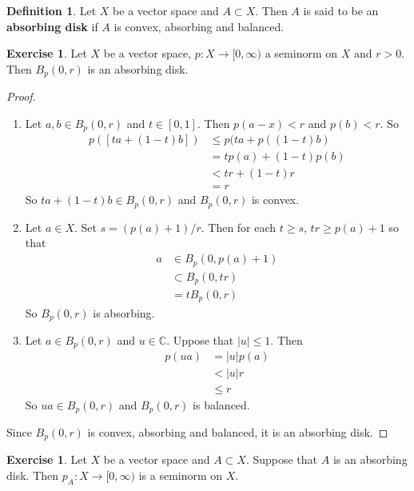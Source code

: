 \documentclass[12pt]{amsart}
\theoremstyle{definition}
\newtheorem{defn}[definition]{Definition}
\newtheorem{ex}[definition]{Exercise}
\newcommand{\C}{\mathbb{C}}
\newcommand{\tbf}[1]{\textbf{#1}}
\newcommand{\Rg}{[0,\infty)}
\DeclareMathOperator*{\0}{\mbf{0}}
\DeclareMathOperator*{\1}{\mbf{1}}
\begin{document}
		\begin{defn}
		Let $X$ be a vector space and $A \subset X$. Then $A$ is said to be an \tbf{absorbing disk} if $A$ is convex, absorbing and balanced.
	\end{defn}
	
	\begin{ex}
		Let $X$ be a vector space, $p :X \rightarrow \Rg$ a seminorm on $X$ and $r >0$. Then $B_p(0, r)$ is an absorbing disk.
	\end{ex}
	
	\begin{proof}\
		\begin{enumerate}
			\item Let $a, b \in B_p(0, r)$ and $t \in [0,1]$. Then $p(a - x) < r$ and $p(b) < r$. So 
			\begin{align*}
				p([ta + (1 - t)b]) 
				&\leq p(ta + p((1-t)b) \\
				&= tp(a) + (1-t)p(b) \\
				&< tr + (1-t)r \\
				&= r
			\end{align*}
			So $ta + (1 - t)b \in B_p(0, r)$ and $B_p(0, r)$ is convex.
			\item Let $a \in X$. Set $s = (p(a) + 1)/ r$. Then for each $t \geq s$, $tr \geq p(a)+1$ so that 
			\begin{align*}
				a 
				& \in B_p(0, p(a)+ 1) \\
				& \subset B_p(0, tr) \\
				& = tB_p(0, r) 
			\end{align*} 
			So $B_p(0,r)$ is absorbing.
			\item Let $a \in B_p(0, r)$ and $u \in \C$. Uppose that $|u| \leq 1$. Then
			\begin{align*}
				p(ua)
				&= |u|p(a) \\
				&< |u|r \\
				&\leq r
			\end{align*}
			So $ua \in B_p(0, r)$ and $B_p(0, r)$ is balanced. 
		\end{enumerate}
		Since $B_p(0, r)$ is convex, absorbing and balanced, it is an absorbing disk. 
	\end{proof}
	
	
	\begin{ex}
		Let $X$ be a vector space and $A \subset X$. Suppose that $A$ is an absorbing disk. Then $p_A:X \rightarrow \Rg$ is a seminorm on $X$.
	\end{ex}
	
\end{document}

